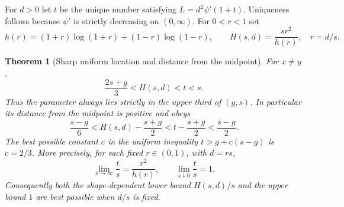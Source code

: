 \documentclass[11pt,a4paper]{article}
\newtheorem{theorem}{Theorem}[section]
\theoremstyle{definition}
\theoremstyle{remark}
\numberwithin{equation}{section}
\begin{document}
For $d>0$ let $t$ be the unique number satisfying
$L=d^2\psi'(1+t)$. Uniqueness follows because $\psi'$ is strictly
decreasing on $(0,\infty)$.
For $0<r<1$ set
\[
 h(r)=(1+r)\log(1+r)+(1-r)\log(1-r),\qquad
 H(s,d)=\frac{s r^2}{h(r)},\quad r=d/s.
\]

\begin{theorem}[Sharp uniform location and distance from the midpoint]
\label{p2:thm:gurland-location}
For $x\ne y$,
\[
 \frac{2s+g}{3}<H(s,d)<t<s.
\]
Thus the parameter always lies strictly in the upper third of $(g,s)$.
In particular its distance from the midpoint is positive and obeys
\[
 \frac{s-g}{6}
 <H(s,d)-\frac{s+g}{2}
 <t-\frac{s+g}{2}<\frac{s-g}{2}.
\]
The best possible constant $c$ in the uniform inequality
$t>g+c(s-g)$ is $c=2/3$.
More precisely, for each fixed $r\in(0,1)$, with $d=rs$,
\[
 \lim_{s\to\infty}\frac{t}{s}=\frac{r^2}{h(r)},\qquad
 \lim_{s\downarrow0}\frac{t}{s}=1.
\]
Consequently both the shape-dependent lower bound $H(s,d)/s$
and the upper bound $1$ are best possible when $d/s$ is fixed.
\end{theorem}
\end{document}
